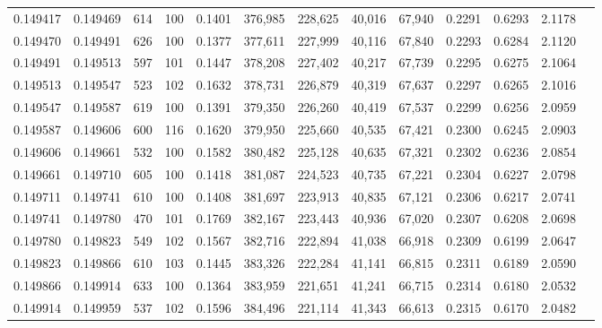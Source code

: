 \begin{tabular}{rrrrrrrrrrrrr}
0.149417 & 0.149469 &   614 & 100 &                                     0.1401 & 376,985 & 228,625 &  40,016 &  67,940 & 0.2291 & 0.6293 & 2.1178 \\
0.149470 & 0.149491 &   626 & 100 &                                     0.1377 & 377,611 & 227,999 &  40,116 &  67,840 & 0.2293 & 0.6284 & 2.1120 \\
0.149491 & 0.149513 &   597 & 101 &                                     0.1447 & 378,208 & 227,402 &  40,217 &  67,739 & 0.2295 & 0.6275 & 2.1064 \\
0.149513 & 0.149547 &   523 & 102 &                                     0.1632 & 378,731 & 226,879 &  40,319 &  67,637 & 0.2297 & 0.6265 & 2.1016 \\
0.149547 & 0.149587 &   619 & 100 &                                     0.1391 & 379,350 & 226,260 &  40,419 &  67,537 & 0.2299 & 0.6256 & 2.0959 \\
0.149587 & 0.149606 &   600 & 116 &                                     0.1620 & 379,950 & 225,660 &  40,535 &  67,421 & 0.2300 & 0.6245 & 2.0903 \\
0.149606 & 0.149661 &   532 & 100 &                                     0.1582 & 380,482 & 225,128 &  40,635 &  67,321 & 0.2302 & 0.6236 & 2.0854 \\
0.149661 & 0.149710 &   605 & 100 &                                     0.1418 & 381,087 & 224,523 &  40,735 &  67,221 & 0.2304 & 0.6227 & 2.0798 \\
0.149711 & 0.149741 &   610 & 100 &                                     0.1408 & 381,697 & 223,913 &  40,835 &  67,121 & 0.2306 & 0.6217 & 2.0741 \\
0.149741 & 0.149780 &   470 & 101 &                                     0.1769 & 382,167 & 223,443 &  40,936 &  67,020 & 0.2307 & 0.6208 & 2.0698 \\
0.149780 & 0.149823 &   549 & 102 &                                     0.1567 & 382,716 & 222,894 &  41,038 &  66,918 & 0.2309 & 0.6199 & 2.0647 \\
0.149823 & 0.149866 &   610 & 103 &                                     0.1445 & 383,326 & 222,284 &  41,141 &  66,815 & 0.2311 & 0.6189 & 2.0590 \\
0.149866 & 0.149914 &   633 & 100 &                                     0.1364 & 383,959 & 221,651 &  41,241 &  66,715 & 0.2314 & 0.6180 & 2.0532 \\
0.149914 & 0.149959 &   537 & 102 &                                     0.1596 & 384,496 & 221,114 &  41,343 &  66,613 & 0.2315 & 0.6170 & 2.0482 \\

\end{tabular}
